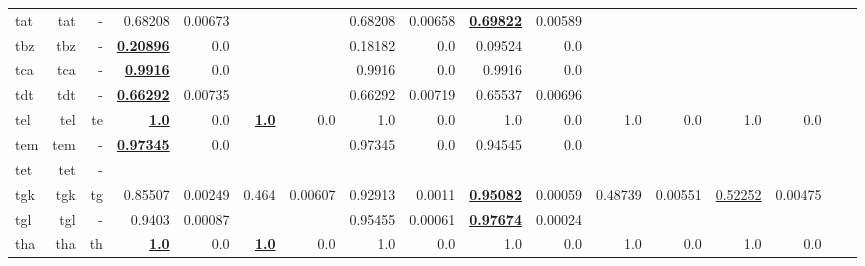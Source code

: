 \documentclass[11pt]{article}
\begin{document}
\begin{table*}[h]
{\begin{tabular}{lrrrrrrrrrrrrrrrr}
tat         & tat         & -         & 0.68208         & 0.00673         &          &          & 0.68208         & 0.00658         & \textbf{\underline{0.69822}}         & 0.00589         &          &          &          &          \\
tbz         & tbz         & -         & \textbf{\underline{0.20896}}         & 0.0         &          &          & 0.18182         & 0.0         & 0.09524         & 0.0         &          &          &          &          \\
tca         & tca         & -         & \textbf{\underline{0.9916}}         & 0.0         &          &          & 0.9916         & 0.0         & 0.9916         & 0.0         &          &          &          &          \\
tdt         & tdt         & -         & \textbf{\underline{0.66292}}         & 0.00735         &          &          & 0.66292         & 0.00719         & 0.65537         & 0.00696         &          &          &          &          \\
tel         & tel         & te         & \textbf{\underline{1.0}}         & 0.0         & \textbf{\underline{1.0}}         & 0.0         & 1.0         & 0.0         & 1.0         & 0.0         & 1.0         & 0.0         & 1.0         & 0.0         \\
tem         & tem         & -         & \textbf{\underline{0.97345}}         & 0.0         &          &          & 0.97345         & 0.0         & 0.94545         & 0.0         &          &          &          &          \\
tet         & tet         & -         &          &          &          &          &          &          &          &          &          &          &          &          \\
tgk         & tgk         & tg         & 0.85507         & 0.00249         & 0.464         & 0.00607         & 0.92913         & 0.0011         & \textbf{\underline{0.95082}}         & 0.00059         & 0.48739         & 0.00551         & \underline{0.52252}         & 0.00475         \\
tgl         & tgl         & -         & 0.9403         & 0.00087         &          &          & 0.95455         & 0.00061         & \textbf{\underline{0.97674}}         & 0.00024         &          &          &          &          \\
tha         & tha         & th         & \textbf{\underline{1.0}}         & 0.0         & \textbf{\underline{1.0}}         & 0.0         & 1.0         & 0.0         & 1.0         & 0.0         & 1.0         & 0.0         & 1.0         & 0.0         \\

\end{tabular}}
\end{table*}
\end{document}
